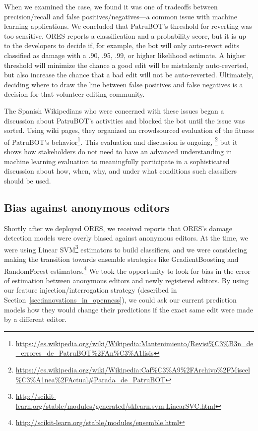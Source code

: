 When we examined the case, we found it was one of tradeoffs between precision/recall and false positives/negatives---a common issue with machine learning applications. We concluded that PatruBOT's threshold for reverting was too sensitive. ORES reports a classification and a probability score, but it is up to the developers to decide if, for example, the bot will only auto-revert edits classified as damage with a .90, .95, .99, or higher likelihood estimate. A higher threshold will minimize the chance a good edit will be mistakenly auto-reverted, but also increase the chance that a bad edit will not be auto-reverted.  Ultimately, deciding where to draw the line between false positives and false negatives is a decision for that volunteer editing community.

The Spanish Wikipedians who were concerned with these issues began a discussion about PatruBOT's activities and blocked the bot until the issue was sorted. Using wiki pages, they organized an crowdsourced evaluation of the fitness of PatruBOT's behavior\footnote{\url{https://es.wikipedia.org/wiki/Wikipedia:Mantenimiento/Revisi\%C3\%B3n_de_errores_de_PatruBOT\%2FAn\%C3\%A1lisis}}.  This evaluation and discussion is ongoing, \footnote{\url{https://es.wikipedia.org/wiki/Wikipedia:Caf\%C3\%A9\%2FArchivo\%2FMiscel\%C3\%A1nea\%2FActual\#Parada_de_PatruBOT}} but it shows how stakeholders do not need to have an advanced understanding in machine learning evaluation to meaningfully participate in a sophisticated discussion about how, when, why, and under what conditions such classifiers should be used.

\subsection{Bias against anonymous editors}

Shortly after we deployed ORES, we received reports that ORES's damage detection models were overly biased against anonymous editors.  At the time, we were using Linear SVM\footnote{\url{http://scikit-learn.org/stable/modules/generated/sklearn.svm.LinearSVC.html}} estimators to build classifiers, and we were considering making the transition towards ensemble strategies like GradientBoosting and RandomForest estimators.\footnote{\url{http://scikit-learn.org/stable/modules/ensemble.html}}  We took the opportunity to look for bias in the error of estimation between anonymous editors and newly registered editors.  By using our feature injection/interrogation strategy (described in Section~\ref{sec:innovations_in_openness}), we could ask our current prediction models how they would change their predictions if the exact same edit were made by a different editor.

